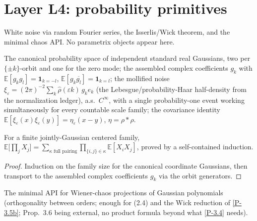 \chapter{Layer L4: probability primitives}\label{ch:probability}

White noise via random Fourier series, the Isserlis/Wick theorem, and the
minimal chaos API. No parametrix objects appear here.

\begin{definition}\label{I-noise}
  \leanok
  The canonical probability space of independent standard real Gaussians,
  two per \(\{\pm k\}\)-orbit and one for the zero mode; the assembled
  complex coefficients \(g_k\) with
  \(\mathbb{E}[g_k g_l] = \mathbf{1}_{k=-l}\),
  \(\mathbb{E}[g_k \overline{g_l}] = \mathbf{1}_{k=l}\); the mollified
  noise \(\xi_\varepsilon = (2\pi)^{-2}\sum_k
  \widehat\rho(\varepsilon k)\, g_k e_k\) (the Lebesgue/probability-Haar
  half-density from the normalization ledger),
  a.s.\ \(C^\infty\), with a single probability-one event working
  simultaneously for every countable scale family; the covariance identity
  \(\mathbb{E}[\xi_\varepsilon(x)\xi_\varepsilon(y)] = \eta_\varepsilon(x-y)\),
  \(\eta = \rho * \rho\).
\end{definition}

\begin{lemma}\label{I-isserlis}
  \leanok
  For a finite jointly-Gaussian centered family,
  \(\mathbb{E}\big[\prod_j X_j\big] = \sum_{\kappa \text{ full pairing}}
  \prod_{\{i,j\}\in\kappa}\mathbb{E}[X_iX_j]\), proved by a
  self-contained induction.
\end{lemma}
\begin{proof}\leanok
  Induction on the family size for the canonical coordinate Gaussians,
  then transport to the assembled complex coefficients \(g_k\) via the
  orbit generators.
\end{proof}

\begin{definition}\label{I-chaos}
  \leanok
  The minimal API for Wiener-chaos projections of Gaussian polynomials
  (orthogonality between orders; enough for (2.4) and the Wick reduction
  of \ref{P-3.5b}; Prop.~3.6 being external, no product formula beyond
  what \ref{P-3.4} needs).
\end{definition}

